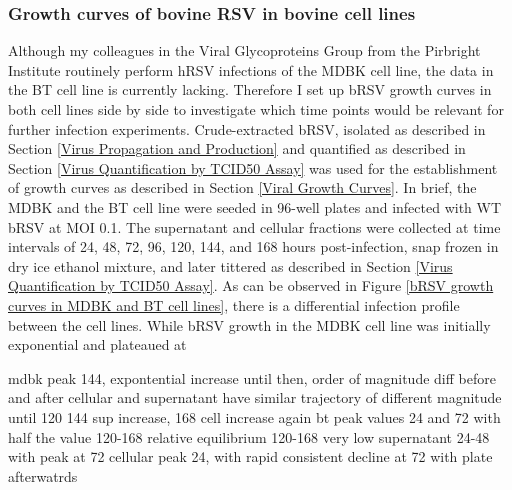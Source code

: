 \subsubsection{Growth curves of bovine RSV in bovine cell lines} \label{Growth curves of bovine RSV in bovine cell lines}
Although my colleagues in the Viral Glycoproteins Group from the Pirbright Institute routinely perform hRSV infections of the MDBK cell line, the data in the BT cell line is currently lacking. Therefore I set up bRSV growth curves in both cell lines side by side to investigate which time points would be relevant for further infection experiments. Crude-extracted bRSV, isolated as described in Section \ref{Virus Propagation and Production} and quantified as described in Section \ref{Virus Quantification by TCID50 Assay} was used for the establishment of growth curves as described in Section \ref{Viral Growth Curves}. In brief, the MDBK and the BT cell line were seeded in 96-well plates and infected with WT bRSV at MOI 0.1. The supernatant and cellular fractions were collected at time intervals of 24, 48, 72, 96, 120, 144, and 168 hours post-infection, snap frozen in dry ice ethanol mixture, and later tittered as described in Section \ref{Virus Quantification by TCID50 Assay}. As can be observed in Figure \ref{bRSV growth curves in MDBK and BT cell lines}, there is a differential infection profile between the cell lines. While bRSV growth in the MDBK cell line was initially exponential and plateaued at


mdbk
    peak 144, expontential increase until then, order of magnitude diff before and after
    cellular and supernatant have similar trajectory of different magnitude until 120
    144 sup increase, 168 cell increase again
bt
    peak values 24 and 72 with half the value 120-168
    relative equilibrium 120-168
    very low supernatant 24-48 with peak at 72
    cellular peak 24, with rapid consistent decline at 72 with plate afterwatrds


